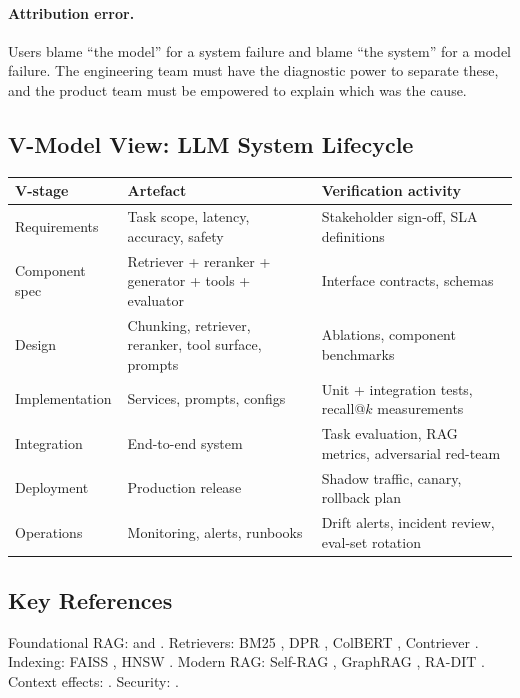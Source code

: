 \paragraph{Attribution error.} Users blame ``the model'' for a
system failure and blame ``the system'' for a model failure. The
engineering team must have the diagnostic power to separate these,
and the product team must be empowered to explain which was the
cause.

\subsection{V-Model View: LLM System Lifecycle}

\begin{center}
\small
\begin{tabular}{p{4.3cm}|p{4.3cm}|p{4.3cm}}
\textbf{V-stage} & \textbf{Artefact} & \textbf{Verification activity}\\\hline
Requirements & Task scope, latency, accuracy, safety & Stakeholder sign-off, SLA definitions \\
Component spec & Retriever + reranker + generator + tools + evaluator & Interface contracts, schemas \\
Design & Chunking, retriever, reranker, tool surface, prompts & Ablations, component benchmarks \\
Implementation & Services, prompts, configs & Unit + integration tests, recall@$k$ measurements \\
Integration & End-to-end system & Task evaluation, RAG metrics, adversarial red-team \\
Deployment & Production release & Shadow traffic, canary, rollback plan \\
Operations & Monitoring, alerts, runbooks & Drift alerts, incident review, eval-set rotation \\
\end{tabular}
\end{center}

\subsection{Key References}

Foundational RAG: \citet{lewis2020retrieval} and \citet{guu2020realm}.
Retrievers: BM25 \citep{robertson2009bm25}, DPR
\citep{karpukhin2020dpr}, ColBERT \citep{khattab2020colbert},
Contriever \citep{izacard2022contriever}. Indexing: FAISS
\citep{johnson2019faiss}, HNSW \citep{malkov2020hnsw}.
Modern RAG: Self-RAG \citep{asai2024selfrag}, GraphRAG
\citep{edge2024graphrag}, RA-DIT \citep{lin2024radit}. Context
effects: \citet{liu2024lost}. Security:
\citet{greshake2023injection}.

